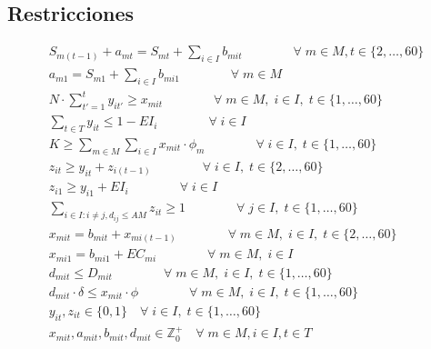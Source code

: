 \documentclass[letterpaper]{article}
\begin{document}
\begin{flushleft}
	\subsection{Restricciones}
	\begin{gather}
		S_{m(t-1)} + a_{mt} = S_{mt} + \sum_{i \in I} b_{mit} \qquad\qquad \forall \; m \in M, t \in \{2, \ldots, 60\}\\
		a_{m1} = S_{m1} + \sum_{i \in I} b_{mi1}  \qquad\qquad \forall \; m \in M\\
		N \cdot \sum_{t'=1}^{t} y_{it'} \geq x_{mit} \qquad\qquad \forall \; m \in M, \; i \in I,\; t \in \{1, \ldots, 60\}\\
		\sum_{t \in T} y_{it} \leq 1 - EI_i \qquad\qquad \forall \; i \in I\\
		K \geq \sum_{m \in M} \sum_{i \in I} x_{mit} \cdot \phi_m \qquad\qquad \forall \; i \in I, \; t \in \{1, \ldots, 60\}\\
		z_{it} \geq y_{it} + z_{i(t-1)} \qquad\qquad \forall \; i \in I, \;t \in \{2, \ldots, 60\}\\
		z_{i1} \geq y_{i1} + EI_i \qquad\qquad \forall \; i \in I\\
		\sum_{i \in I: i \neq j, d_{ij}\leq AM} z_{it} \geq 1 \qquad\qquad \forall \; j \in I, \; t \in \{1, \ldots, 60\}\\
		x_{mit} = b_{mit} + x_{mi(t-1)} \qquad\qquad \forall \; m \in M, \; i \in I, \; t \in \{2, \ldots, 60\}\\
		x_{mi1} = b_{mi1} + EC_{mi} \qquad\qquad \forall \; m \in M, \; i \in I\\
		d_{mit} \leq D_{mit} \qquad\qquad \forall \; m \in M, \; i \in I, \; t \in \{1, \ldots, 60\}\\
		d_{mit} \cdot \delta \leq x_{mit} \cdot \phi \qquad\qquad \forall \; m \in M, \; i \in I, \; t \in \{1, \ldots, 60\}\\
		y_{it}, z_{it} \in \{0, 1\} \quad \forall \; i \in I, \; t \in \{1, \ldots, 60\}\\
		x_{mit}, a_{mit}, b_{mit}, d_{mit} \in \mathbb{Z}^{+}_0 \quad \forall \; m\in M, i\in I, t\in T
	\end{gather}
	

\end{flushleft}
\end{document}
